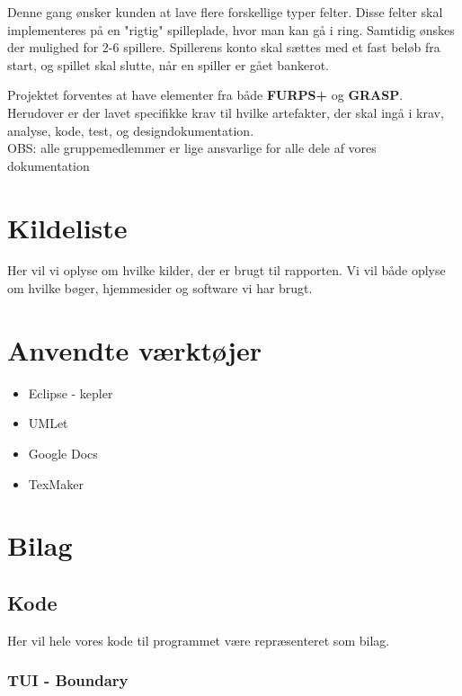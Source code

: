 \documentclass{article}
\begin{document}
Denne gang ønsker kunden at lave flere forskellige typer felter. Disse felter skal implementeres på en "rigtig" spilleplade, hvor man kan gå i ring. Samtidig ønskes der mulighed for 2-6 spillere. Spillerens konto skal sættes med et fast beløb fra start, og spillet skal slutte, når en spiller er gået bankerot.


Projektet forventes at have elementer fra både \textbf{FURPS+} og \textbf{GRASP}. Herudover er der lavet specifikke krav til hvilke artefakter, der skal ingå i krav, analyse, kode, test, og designdokumentation.
\\

OBS: alle gruppemedlemmer er lige ansvarlige for alle dele af vores dokumentation










\section{Kildeliste}
Her vil vi oplyse om hvilke kilder, der er brugt til rapporten.
Vi vil både oplyse om hvilke bøger, hjemmesider og software vi har brugt.
\printbibliography %
\section{Anvendte værktøjer}
\begin{itemize}
\item Eclipse - kepler
\item UMLet
\item Google Docs
\item TexMaker
\end{itemize}
\newpage
\section{Bilag}
\subsection{Kode}
Her vil hele vores kode til programmet være repræsenteret som bilag.
\subsubsection{TUI - Boundary}

\end{document}
